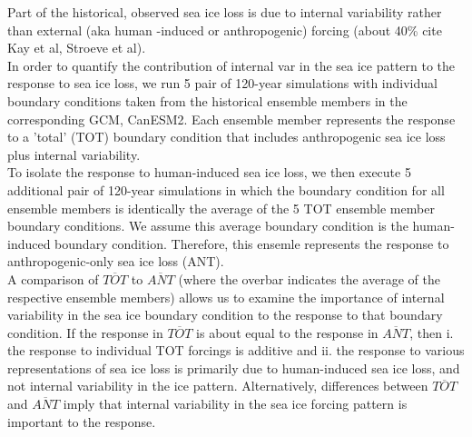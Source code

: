 \documentclass[twocol]{ametsoc}
\begin{document}
Part of the historical, observed sea ice loss is due to internal variability rather than external (aka human -induced or anthropogenic) forcing (about 40\% cite Kay et al, Stroeve et al). \\
In order to quantify the contribution of internal var in the sea ice pattern to the response to sea ice loss, we run 5 pair of 120-year simulations with individual boundary conditions taken from the historical ensemble members in the corresponding GCM, CanESM2. Each ensemble member represents the response to a 'total' (TOT) boundary condition that includes anthropogenic sea ice loss plus internal variability. \\
To isolate the response to human-induced sea ice loss, we then execute 5 additional pair of 120-year simulations in which the boundary condition for all ensemble members is identically the average of the 5 TOT ensemble member boundary conditions. We assume this average boundary condition is the human-induced boundary condition. Therefore, this ensemle represents the response to anthropogenic-only sea ice loss (ANT).\\
A comparison of $\overline{TOT}$ to $\overline{ANT}$ (where the overbar indicates the average of the respective ensemble members) allows us to examine the importance of internal variability in the sea ice boundary condition to the response to that boundary condition. If the response in $\overline{TOT}$ is about equal to the response in $\overline{ANT}$, then i. the response to individual TOT forcings is additive and ii. the response to various representations of sea ice loss is primarily due to human-induced sea ice loss, and not internal variability in the ice pattern. Alternatively, differences between $\overline{TOT}$ and $\overline{ANT}$ imply that internal variability in the sea ice forcing pattern is important to the response.\\


\end{document}
